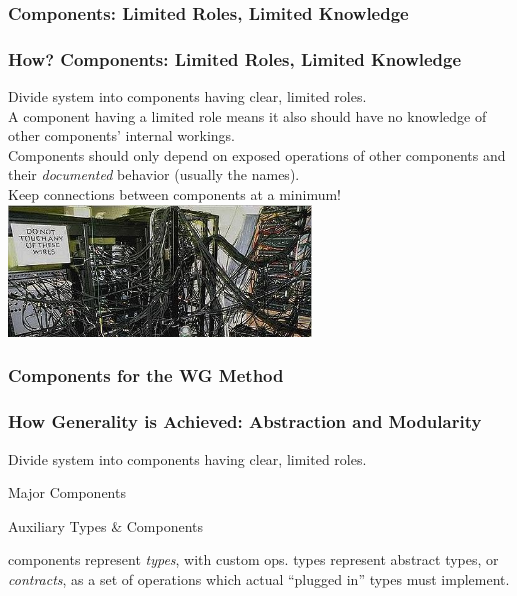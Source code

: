 \documentclass{beamer}
\begin{document}
\subsubsection{Components: Limited Roles, Limited Knowledge}

\begin{frame}
  \frametitle{How? Components: Limited Roles, Limited Knowledge}
  Divide system into components having clear, limited roles.
  \pause
   \raisebox{3mm}{$\implies$} \\
  A component having a limited role means it also should have no knowledge of other components' internal workings.\\
  \pause
  Components should only depend on exposed operations of other components and their \emph{documented} behavior (usually the names).\\
  \pause
  Keep connections between components at a minimum!
  \includegraphics[height=3.5cm]{crazy-wiring.jpg}
\end{frame}

\subsubsection{Components for the WG Method}

\begin{frame}
  \frametitle{How Generality is Achieved: Abstraction and Modularity}
  Divide system into components having clear, limited roles.\\
  \pause
  \begin{block}{Major Components}
  \end{block}
  \pause
  \begin{block}{Auxiliary Types \& Components}
  \end{block}
  \pause
   components represent \emph{types}, with custom ops.
  \pause
   types represent abstract
  types, or \emph{contracts}, as a set of operations which actual ``plugged in'' types must implement.
\end{frame}
\end{document}
